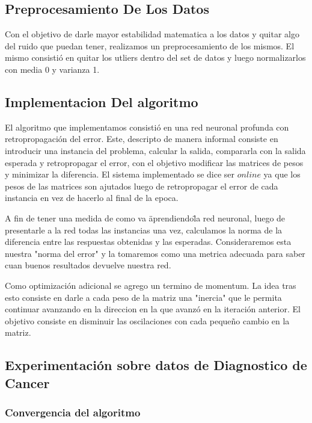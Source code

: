 \subsection{Preprocesamiento De Los Datos} 
Con el objetivo de darle mayor estabilidad matematica a los datos y quitar algo del ruido que puedan tener, realizamos un preprocesamiento de los mismos. El mismo consistió en quitar los utliers dentro del set de datos y luego normalizarlos con media 0 y varianza 1.

\subsection{Implementacion Del algoritmo} 

El algoritmo que implementamos consistió en una red neuronal profunda con retropropagación del error. Este, descripto de manera informal consiste en introducir una instancia del problema, calcular la salida, compararla con la salida esperada y retropropagar el error, con el objetivo modificar las matrices de pesos y minimizar la diferencia. El sistema implementado se dice ser $online$ ya que los pesos de las matrices son ajutados luego de retropropagar el error de cada instancia en vez de hacerlo al final de la epoca.

A fin de tener una medida de como va \"aprendiendo\" la red neuronal, luego de presentarle a la red todas las instancias una vez, calculamos la norma de la diferencia entre las respuestas obtenidas y las esperadas. Consideraremos esta nuestra "norma del error" y la tomaremos como una metrica adecuada para saber cuan buenos resultados devuelve nuestra red.



Como optimización adicional se agrego un termino de momentum. La idea tras esto consiste en darle a cada peso de la matriz una "inercia" que le permita continuar avanzando en la direccion en la que avanzó en la iteración anterior. El objetivo consiste en disminuir las oscilaciones con cada pequeño cambio en la matriz.

\subsection{Experimentación sobre datos de Diagnostico de Cancer}

\subsubsection{Convergencia del algoritmo} 

